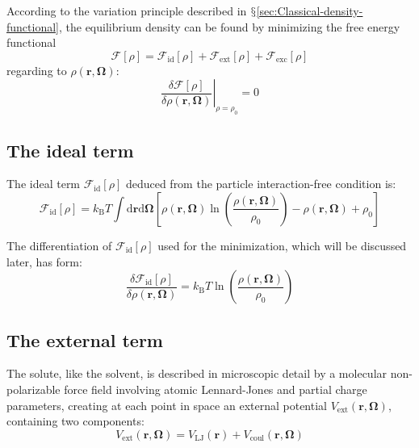 According to the variation principle described in $\mathsection$\ref{sec:Classical-density-functional},
the equilibrium density can be found by minimizing the free energy
functional
\begin{equation}
\mathcal{F}[\rho]=\mathcal{F}_{\mathrm{id}}[\rho]+\mathcal{F}_{\mathrm{ext}}[\rho]+\mathcal{F}_{\mathrm{exc}}[\rho]\label{eq:4.fff}
\end{equation}
regarding to $\rho(\mathbf{r},\mathbf{\Omega})$:
\begin{equation}
\left.\frac{\delta\mathcal{F}[\rho]}{\delta\rho(\mathbf{r},\mathbf{\Omega})}\right|_{\rho=\rho_{0}}=0
\end{equation}


\subsection{The ideal term}

The ideal term $\mathcal{F}_{\mathrm{id}}[\rho]$ deduced from the
particle interaction-free condition is:
\begin{equation}
\mathcal{F}_{\mathrm{id}}[\rho]=k_{\mathrm{B}}T\int\mathrm{d}\mathbf{r}\mathrm{d}\mathbf{\Omega}\left[\rho(\mathbf{r},\mathbf{\mathbf{\mathbf{\Omega}}})\ln\left(\frac{\rho(\mathbf{r},\mathbf{\mathbf{\mathbf{\mathbf{\Omega}}}})}{\rho_{0}}\right)-\rho(\mathbf{r},\mathbf{\mathbf{\mathbf{\Omega}}})+\rho_{0}\right]
\end{equation}

The differentiation of $\mathcal{F}_{\mathrm{id}}[\rho]$ used for
the minimization, which will be discussed later, has form:
\begin{equation}
\frac{\delta\mathcal{F}_{\mathrm{id}}[\rho]}{\delta\rho(\mathbf{r},\mathbf{\Omega})}=k_{\mathrm{B}}T\ln\left(\dfrac{\rho(\mathbf{r},\mathbf{\Omega})}{\rho_{0}}\right)
\end{equation}


\subsection{The external term\label{subsec:The-external-term}}

The solute, like the solvent, is described in microscopic detail by
a molecular non-polarizable force field involving atomic Lennard-Jones
and partial charge parameters, creating at each point in space an
external potential $V_{\mathrm{ext}}(\mathbf{r},\mathbf{\mathbf{\mathbf{\mathbf{\Omega}}}})$,
containing two components:
\begin{equation}
V_{\mathrm{ext}}(\mathbf{r},\mathbf{\Omega})=V_{\mathrm{LJ}}(\mathbf{r})+V_{\mathrm{coul}}(\mathbf{r},\mathbf{\Omega})
\end{equation}

